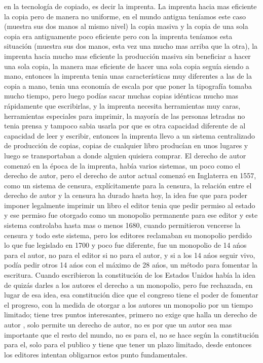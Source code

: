 \begin{multicols}{2}
en la tecnología de copiado, es decir la imprenta. La imprenta hacia mas eficiente la copia pero de manera no uniforme, en el mundo antigua teníamos este caso (muestra sus dos manos al mismo nivel) la copia masiva y la copia de una sola copia era antiguamente poco eficiente pero con la imprenta teníamos esta situación (muestra sus dos manos, esta vez una mucho mas arriba que la otra), la imprenta hacia mucho mas eficiente la producción masiva sin beneficiar a hacer una sola copia, la manera mas eficiente de hacer una sola copia seguía siendo a mano, entonces la imprenta tenia unas características muy diferentes a las de la copia a mano, tenia una economía de escala por que poner la tipografía tomaba mucho tiempo, pero luego podías sacar muchas copias idénticas mucho mas rápidamente que escribirlas, y la imprenta necesita herramientas muy caras, herramientas especiales para imprimir, la mayoría de las personas letradas no tenia prensa y tampoco sabia usarla por que es otra capacidad diferente de al capacidad de leer y escribir, entonces la imprenta llevo a un sistema centralizado de producción de copias, copias de cualquier libro producían en unos lugares y luego se transportaban a donde alguien quisiera comprar. 
El derecho de autor comenzó en la época de la imprenta, había varios sistemas, un poco como el derecho de autor, pero el derecho de autor actual comenzó en Inglaterra en 1557, como un sistema de censura, explícitamente para la censura, la relación entre el derecho de autor y la censura ha durado hasta hoy, la idea fue que para poder imponer legalmente imprimir un libro el editor tenia que pedir permiso al estado y ese permiso fue otorgado como un monopolio permanente para ese editor y este sistema controlaba hasta mas o menos 1680, cuando permitieron vencerse la censura y todo este sistema, pero los editores reclamaban su monopolio perdido lo que fue legislado en 1700 y poco fue diferente, fue un monopolio de 14 ańos para el autor, no para el editor si no para el autor, y si a los 14 ańos seguir vivo, podía pedir otros 14 ańos con el máximo de 28 ańos, un método para fomentar la escritura. 
Cuando escribieron la constitución de los Estados Unidos había la idea de quizás darles a los autores el derecho a un monopolio, pero fue rechazada, en lugar de esa idea, esa constitución dice que el congreso tiene el poder de fomentar el progreso, con la medida de otorgar a los autores un monopolio por un tiempo limitado; tiene tres puntos interesantes, primero no exige que halla un derecho de autor , solo permite un derecho de autor, {\em {\color{introcolor}{ si hay algún derecho de autor es para promover el progreso, }}}  no es por que un autor sea mas importante que el resto del mundo, no es para el, no se hace según la constitución para el, solo para el publico y tiene que tener un plazo limitado, desde entonces los editores intentan obligarnos estos punto fundamentales.

\end{multicols}
